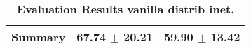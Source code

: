 \begin{table}[htb]
{\begin{tabular}{lll}
\midrule
\textbf{Summary                                  } &                  \phantom{0}67.74 $\pm$ 20.21 &                       \phantom{0}59.90 $\pm$ 13.42 \\
\bottomrule
\end{tabular}%
}
\caption{\textbf{Evaluation Results vanilla distrib inet.}}
\label{tab:eval-results}
\end{table}
